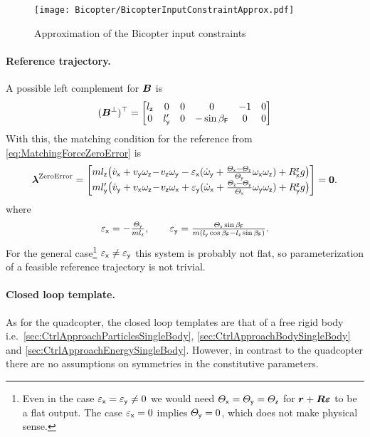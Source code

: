 \begin{figure}[ht]
 \centering
 \texttt{[image: Bicopter/BicopterInputConstraintApprox.pdf]}
 \caption{Approximation of the Bicopter input constraints}
 \label{fig:BicopterInputConstraintApprox}
\end{figure}

\paragraph{Reference trajectory.}
A possible left complement for $\boldsymbol{B}$ is
\begin{align}
 (\boldsymbol{B}^\bot)^\top = \begin{bmatrix} l_{\mathsf{z}} & 0 & 0 & 0 & -1 & 0 \\ 0 & l_{\mathsf{y}}' & 0 & -\sin\beta_{\mathsf{F}} & 0 & 0 \end{bmatrix}
\end{align}
With this, the matching condition for the reference from \eqref{eq:MatchingForceZeroError} is
\begin{align}
 \boldsymbol{\lambda}^{\text{ZeroError}} = 
 \begin{bmatrix} 
  m l_{\mathsf{z}}  \big( \dot{v}_{\mathsf{x}} + v_{\mathsf{y}}\omega_{\mathsf{z}} \!-\! v_{\mathsf{z}}\omega_{\mathsf{y}} - \varepsilon_{\mathsf{x}} (\dot{\omega}_{\mathsf{y}} + \tfrac{\varTheta_{\mathsf{x}}-\varTheta_{\mathsf{z}}}{\varTheta_{\mathsf{y}}} \omega_{\mathsf{x}}\omega_{\mathsf{z}}) + R^{\mathsf{z}}_{\mathsf{x}}g \big)  \\
  m l_{\mathsf{y}}' \big( \dot{v}_{\mathsf{y}} + v_{\mathsf{x}}\omega_{\mathsf{z}} \!-\! v_{\mathsf{z}}\omega_{\mathsf{x}} + \varepsilon_{\mathsf{y}} (\dot{\omega}_{\mathsf{x}} + \tfrac{\varTheta_{\mathsf{z}}-\varTheta_{\mathsf{y}}}{\varTheta_{\mathsf{x}}} \omega_{\mathsf{y}}\omega_{\mathsf{z}}) + R^{\mathsf{z}}_{\mathsf{y}}g \big)
 \end{bmatrix}
 = \boldsymbol{0}
 .
\end{align}
where
\begin{align}
 \varepsilon_{\mathsf{x}} = -\tfrac{\varTheta_{\mathsf{y}}}{m l_{\mathsf{z}}},
\qquad
 \varepsilon_{\mathsf{y}} = \tfrac{\varTheta_{\mathsf{x}} \sin\beta_{\mathsf{F}}}{m (l_{\mathsf{y}} \cos\beta_{\mathsf{F}} - l_{\mathsf{z}} \sin\beta_{\mathsf{F}})}.
\end{align}
For the general case\footnote{Even in the case $\varepsilon_{\mathsf{x}}=\varepsilon_{\mathsf{y}}\neq0$ we would need $\varTheta_{\mathsf{x}}=\varTheta_{\mathsf{y}}=\varTheta_{\mathsf{z}}$ for $\boldsymbol{r}+\boldsymbol{R} \boldsymbol{\varepsilon}$ to be a flat output. The case $\varepsilon_{\mathsf{x}}=0$ implies $\varTheta_{\mathsf{y}}=0$, which does not make physical sense.} 
$\varepsilon_{\mathsf{x}}\neq\varepsilon_{\mathsf{y}}$ this system is probably not flat, so parameterization of a feasible reference trajectory is not trivial.

\paragraph{Closed loop template.}
As for the quadcopter, the closed loop templates are that of a free rigid body i.e.\ \autoref{sec:CtrlApproachParticlesSingleBody}, \autoref{sec:CtrlApproachBodySingleBody} and \autoref{sec:CtrlApproachEnergySingleBody}.
However, in contrast to the quadcopter there are no assumptions on symmetries in the constitutive parameters.

